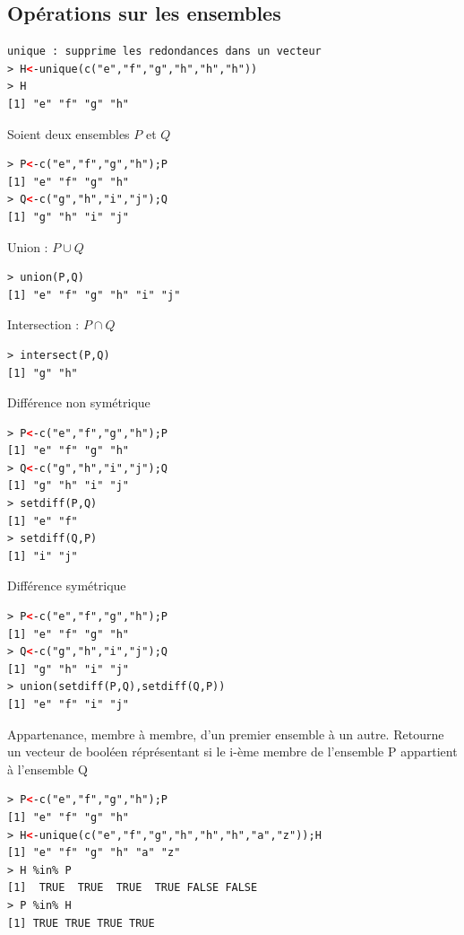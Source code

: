 \subsection{Opérations sur les ensembles}
\begin{lstlisting}[language=html]
unique : supprime les redondances dans un vecteur
> H<-unique(c("e","f","g","h","h","h"))
> H
[1] "e" "f" "g" "h"
\end{lstlisting}
Soient deux ensembles $P$ et $Q$
\begin{lstlisting}[language=html]
> P<-c("e","f","g","h");P
[1] "e" "f" "g" "h"
> Q<-c("g","h","i","j");Q
[1] "g" "h" "i" "j"
\end{lstlisting}
Union : $P\cup Q$
\begin{lstlisting}[language=html]
> union(P,Q)
[1] "e" "f" "g" "h" "i" "j"
\end{lstlisting}
Intersection : $P\cap Q$
\begin{lstlisting}[language=html]
> intersect(P,Q)
[1] "g" "h"
\end{lstlisting}
Différence non symétrique
\begin{lstlisting}[language=html]
> P<-c("e","f","g","h");P
[1] "e" "f" "g" "h"
> Q<-c("g","h","i","j");Q
[1] "g" "h" "i" "j"
> setdiff(P,Q)
[1] "e" "f"
> setdiff(Q,P)
[1] "i" "j"
\end{lstlisting}
Différence symétrique
\begin{lstlisting}[language=html]
> P<-c("e","f","g","h");P
[1] "e" "f" "g" "h"
> Q<-c("g","h","i","j");Q
[1] "g" "h" "i" "j"
> union(setdiff(P,Q),setdiff(Q,P))
[1] "e" "f" "i" "j"
\end{lstlisting}
Appartenance, membre à membre, d'un premier ensemble à un autre. Retourne un vecteur de booléen réprésentant si le i-ème membre de l'ensemble P appartient à l'ensemble Q
\begin{lstlisting}[language=html]
> P<-c("e","f","g","h");P
[1] "e" "f" "g" "h"
> H<-unique(c("e","f","g","h","h","h","a","z"));H
[1] "e" "f" "g" "h" "a" "z"
> H %in% P
[1]  TRUE  TRUE  TRUE  TRUE FALSE FALSE
> P %in% H
[1] TRUE TRUE TRUE TRUE
\end{lstlisting}

